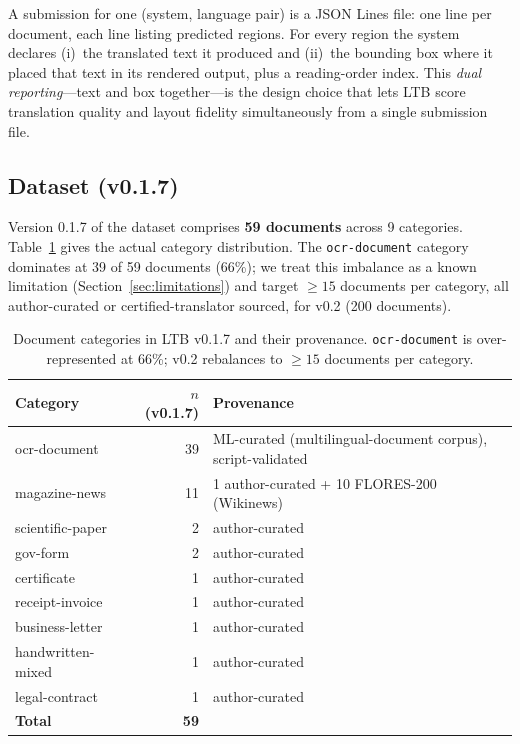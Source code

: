 \documentclass[11pt]{article}
\begin{document}
A submission for one (system, language pair) is a JSON Lines file: one line per
document, each line listing predicted regions. For every region the system
declares (i)~the translated text it produced and (ii)~the bounding box where it
placed that text in its rendered output, plus a reading-order index. This
\emph{dual reporting}---text and box together---is the design choice that lets
LTB score translation quality and layout fidelity simultaneously from a single
submission file.

\subsection{Dataset (v0.1.7)}

Version 0.1.7 of the dataset comprises \textbf{59 documents} across 9
categories. Table~\ref{tab:categories} gives the actual category distribution.
The \texttt{ocr-document} category dominates at 39 of 59 documents (66\%); we
treat this imbalance as a known limitation (Section~\ref{sec:limitations}) and
target $\geq 15$ documents per category, all author-curated or
certified-translator sourced, for v0.2 (200 documents).

\begin{table}[t]
\centering
\small
\begin{tabular}{@{}lrl@{}}
\toprule
\textbf{Category} & \textbf{$n$ (v0.1.7)} & \textbf{Provenance} \\
\midrule
ocr-document       & 39 & ML-curated (multilingual-document corpus), script-validated \\
magazine-news      & 11 & 1 author-curated + 10 FLORES-200 (Wikinews) \\
scientific-paper   &  2 & author-curated \\
gov-form           &  2 & author-curated \\
certificate        &  1 & author-curated \\
receipt-invoice    &  1 & author-curated \\
business-letter    &  1 & author-curated \\
handwritten-mixed  &  1 & author-curated \\
legal-contract     &  1 & author-curated \\
\midrule
\textbf{Total}     & \textbf{59} & \\
\bottomrule
\end{tabular}
\caption{Document categories in LTB v0.1.7 and their provenance.
\texttt{ocr-document} is over-represented at 66\%; v0.2 rebalances to
$\geq 15$ documents per category.}
\label{tab:categories}
\end{table}
\end{document}

